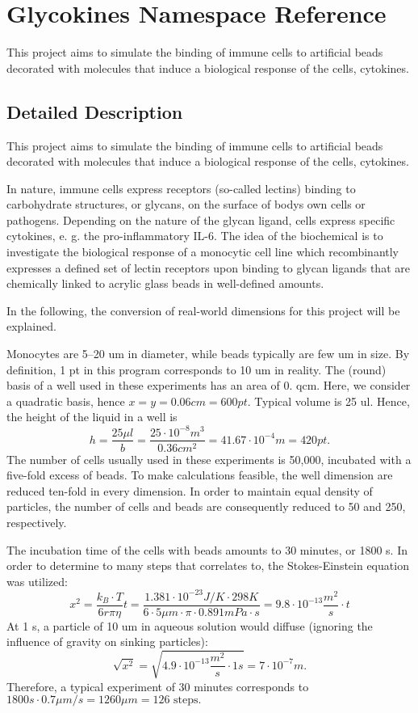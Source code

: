 \hypertarget{namespace_glycokines}{}\section{Glycokines Namespace Reference}
\label{namespace_glycokines}


This project aims to simulate the binding of immune cells to artificial beads decorated with molecules that induce a biological response of the cells, cytokines.  




\subsection{Detailed Description}
This project aims to simulate the binding of immune cells to artificial beads decorated with molecules that induce a biological response of the cells, cytokines. 

In nature, immune cells express receptors (so-\/called lectins) binding to carbohydrate structures, or glycans, on the surface of body\textquotesingle{}s own cells or pathogens. Depending on the nature of the glycan ligand, cells express specific cytokines, e. g. the pro-\/inflammatory I\+L-\/6. The idea of the biochemical is to investigate the biological response of a monocytic cell line which recombinantly expresses a defined set of lectin receptors upon binding to glycan ligands that are chemically linked to acrylic glass beads in well-\/defined amounts.

In the following, the conversion of real-\/world dimensions for this project will be explained.

Monocytes are 5--20 um in diameter, while beads typically are few um in size. By definition, 1 pt in this program corresponds to 10 um in reality. The (round) basis of a well used in these experiments has an area of 0. qcm. Here, we consider a quadratic basis, hence $x=y=0.06 cm=600 pt$. Typical volume is 25 ul. Hence, the height of the liquid in a well is \[ h = \frac{25 \mu l}{b} = \frac{25 \cdot 10^{-8} m^3}{0.36 cm^2} = 41.67 \cdot 10^{-4} m = 420 pt. \] The number of cells usually used in these experiments is 50,000, incubated with a five-\/fold excess of beads. To make calculations feasible, the well dimension are reduced ten-\/fold in every dimension. In order to maintain equal density of particles, the number of cells and beads are consequently reduced to 50 and 250, respectively.

The incubation time of the cells with beads amounts to 30 minutes, or 1800 s. In order to determine to many steps that correlates to, the Stokes-\/\+Einstein equation was utilized\+: \[ x^2 = \frac{k_B \cdot T}{6r \pi \eta} t = \frac{1.381 \cdot 10^{-23} J/K \cdot 298 K}{6 \cdot 5 \mu m \cdot \pi \cdot 0.891 mPa \cdot s} = 9.8 \cdot 10^{-13} \frac{m^2}{s} \cdot t \] At 1 s, a particle of 10 um in aqueous solution would diffuse (ignoring the influence of gravity on sinking particles)\+: \[ \sqrt{x^2} = \sqrt{4.9 \cdot 10^{-13} \frac{m^2}{s} \cdot 1s} = 7 \cdot 10^{-7} m.\] Therefore, a typical experiment of 30 minutes corresponds to $ 1800 s \cdot 0.7 \mu m/s = 1260 \mu m = 126\mbox{ steps}. $

